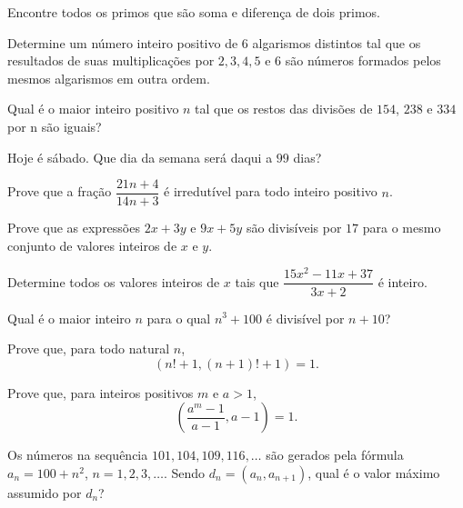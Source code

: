 \documentclass[10pt,a4paper]{article}
\begin{document}
	\begin{prob} Encontre todos os primos que são soma e diferença de dois primos.
	\end{prob}
	
	\begin{prob}
		Determine um número inteiro positivo de $6$ algarismos distintos tal que os resultados de suas multiplicações por $2, 3, 4, 5$ e $6$ são números formados pelos mesmos algarismos em outra ordem.
	\end{prob}
	
	\begin{prob}
		Qual é o maior inteiro positivo $n$ tal que os restos das divisões de $154$, $238$ e $334$ por n são iguais? 
	\end{prob}
	
	\begin{prob}
		Hoje é sábado. Que dia da semana será daqui a $99$ dias?
	\end{prob}
	
	\begin{prob} Prove que a fração $\dfrac{21n+4}{14n+3}$ é irredutível para todo inteiro positivo $n$.
	\end{prob}
	
	\begin{prob} 
	Prove que as expressões $2x+3y$ e $9x+5y$ são divisíveis por $17$ para o mesmo conjunto de valores inteiros de $x$ e $y$.
	\end{prob}
	
	\begin{prob} Determine todos os valores inteiros de $x$ tais que $\dfrac{15x^2-11x+37}{3x+2}$ é inteiro.
	\end{prob}
	
	\begin{prob} Qual é o maior inteiro $n$ para o qual $n^3+100$ é divisível por $n+10$?
	\end{prob}
	
	\begin{prob} Prove que, para todo natural $n$, \[(n!+1,(n+1)!+1)=1.\]
	\end{prob}
	
	\begin{prob} Prove que, para inteiros positivos $m$ e $a>1$, \[\left(\frac{a^m-1}{a-1},a-1\right)=1.\]
	\end{prob}
	
	\begin{prob}
		Os números na sequência $101, 104, 109, 116, \dots$ são gerados pela fórmula $a_n=100+n^2$, $n=1,2,3,\dots$. Sendo $d_n=(a_n,a_{n+1})$, qual é o valor máximo assumido por $d_n$?
	\end{prob}
	
\end{document}

